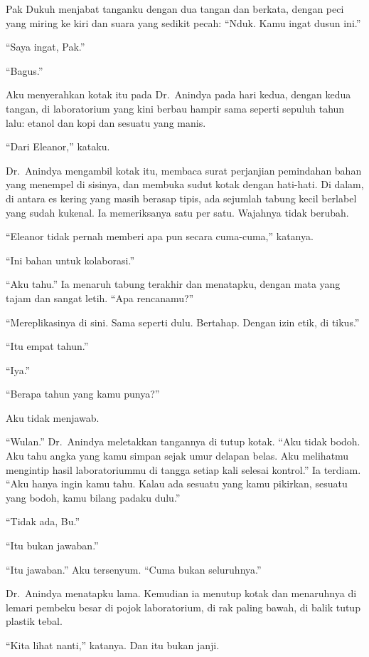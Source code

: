 \documentclass[11pt,twoside,openany]{book}
\makeatletter
\newcommand{\scenebreak}{\par\vspace{0.9em}{\centering\textsc{*\hspace{0.7em}*\hspace{0.7em}*}\par}\vspace{0.9em}\@afterindentfalse\@afterheading}
\makeatother
\begin{document}
Pak Dukuh menjabat tanganku dengan dua tangan dan berkata, dengan peci yang miring ke kiri dan suara yang sedikit pecah: ``Nduk. Kamu ingat dusun ini.''

``Saya ingat, Pak.''

``Bagus.''

\scenebreak
Aku menyerahkan kotak itu pada Dr.~Anindya pada hari kedua, dengan kedua tangan, di laboratorium yang kini berbau hampir sama seperti sepuluh tahun lalu: etanol dan kopi dan sesuatu yang manis.

``Dari Eleanor,'' kataku.

Dr.~Anindya mengambil kotak itu, membaca surat perjanjian pemindahan bahan yang menempel di sisinya, dan membuka sudut kotak dengan hati-hati. Di dalam, di antara es kering yang masih berasap tipis, ada sejumlah tabung kecil berlabel yang sudah kukenal. Ia memeriksanya satu per satu. Wajahnya tidak berubah.

``Eleanor tidak pernah memberi apa pun secara cuma-cuma,'' katanya.

``Ini bahan untuk kolaborasi.''

``Aku tahu.'' Ia menaruh tabung terakhir dan menatapku, dengan mata yang tajam dan sangat letih. ``Apa rencanamu?''

``Mereplikasinya di sini. Sama seperti dulu. Bertahap. Dengan izin etik, di tikus.''

``Itu empat tahun.''

``Iya.''

``Berapa tahun yang kamu punya?''

Aku tidak menjawab.

``Wulan.'' Dr.~Anindya meletakkan tangannya di tutup kotak. ``Aku tidak bodoh. Aku tahu angka yang kamu simpan sejak umur delapan belas. Aku melihatmu mengintip hasil laboratoriummu di tangga setiap kali selesai kontrol.'' Ia terdiam. ``Aku hanya ingin kamu tahu. Kalau ada sesuatu yang kamu pikirkan, sesuatu yang bodoh, kamu bilang padaku dulu.''

``Tidak ada, Bu.''

``Itu bukan jawaban.''

``Itu jawaban.'' Aku tersenyum. ``Cuma bukan seluruhnya.''

Dr.~Anindya menatapku lama. Kemudian ia menutup kotak dan menaruhnya di lemari pembeku besar di pojok laboratorium, di rak paling bawah, di balik tutup plastik tebal.

``Kita lihat nanti,'' katanya. Dan itu bukan janji.
\end{document}
